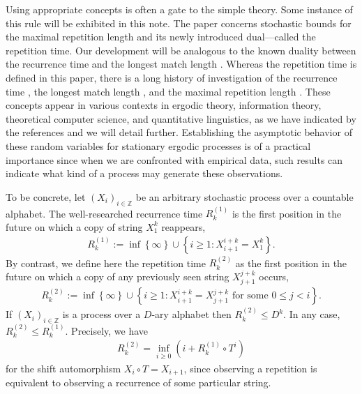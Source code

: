 \documentclass[a4paper,12pt]{article}
\newcommand{\okra}[1]{\left( #1 \right)}
\newcommand{\klam}[1]{\left\{ #1 \right\}}
\begin{document}
Using appropriate concepts is often a gate to the simple theory. Some
instance of this rule will be exhibited in this note. The paper
concerns stochastic bounds for the maximal repetition length and its
newly introduced dual---called the repetition time.  Our development
will be analogous to the known duality between the recurrence time and
the longest match length \citep{WynerZiv89}.  Whereas the repetition
time is defined in this paper, there is a long history of
investigation of the recurrence time
\citep{Kac47,WynerZiv89,OrnsteinWeiss93,Kontoyiannis98,Ko12}, the
longest match length \citep{WynerZiv89,OrnsteinWeiss93,Szpankowski93,
  KontoyiannisOthers98,GaoKontoyiannisBienenstock08}, and the maximal
repetition length
\citep{DeLuca99,KolpakovKucherov99a,KolpakovKucherov99,CrochemoreIlie08,
  ErdosRenyi70,ArratiaWaterman89,Shields92b,Shields97,
  Szpankowski93,Szpankowski93a,KontoyiannisSuhov94,
  Debowski11b,Debowski17,Debowski18b}. These concepts appear in
various contexts in ergodic theory, information theory, theoretical
computer science, and quantitative linguistics, as we have indicated
by the references and we will detail further.  Establishing the
asymptotic behavior of these random variables for stationary ergodic
processes is of a practical importance since when we are confronted
with empirical data, such results can indicate what kind of a process
may generate these observations.

To be concrete, let $(X_i)_{i\in\mathbb{Z}}$ be an arbitrary
stochastic process over a countable alphabet. The well-researched
recurrence time $R^{(1)}_k$ is the first position in the future on
which a copy of string $X_1^k$ reappears,
\begin{align}
  R^{(1)}_k:=\inf\klam{\infty}\cup\klam{i\ge 1: X_{i+1}^{i+k}=X_1^k}.
\end{align}
By contrast, we define here the repetition time $R^{(2)}_k$ as the
first position in the future on which a copy of any previously seen
string $X_{j+1}^{j+k}$ occurs,
\begin{align}
  R^{(2)}_k:=\inf\klam{\infty}\cup\klam{i\ge 1:
  X_{i+1}^{i+k}=X_{j+1}^{j+k}\text{ for some } 0\le j<i}.
\end{align}
If $(X_i)_{i\in\mathbb{Z}}$ is a process over a $D$-ary alphabet then
$R^{(2)}_k\le D^k$. In any case, $R^{(2)}_k\le R^{(1)}_k$. Precisely,
we have
\begin{align}
  \label{Minimum}
  R^{(2)}_k=\inf_{i\ge 0}\okra{i+R^{(1)}_k\circ T^i}
\end{align}
for the shift automorphism $X_i\circ T=X_{i+1}$, since observing a
repetition is equivalent to observing a recurrence of some particular
string.
\end{document}
